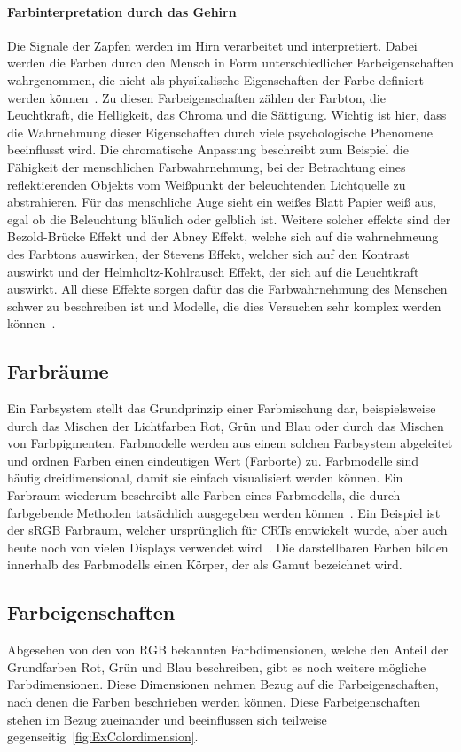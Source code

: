 \documentclass[12pt, a4paper, ngerman]{article}
\begin{document}
\paragraph{Farbinterpretation durch das Gehirn}
Die Signale der Zapfen werden im Hirn verarbeitet und interpretiert. 
Dabei werden die Farben durch den Mensch in Form unterschiedlicher Farbeigenschaften wahrgenommen, 
die nicht als physikalische Eigenschaften der Farbe definiert werden können~\cite{Ottosson_2020}.
Zu diesen Farbeigenschaften zählen der Farbton, die Leuchtkraft, die Helligkeit, das Chroma und die Sättigung.
Wichtig ist hier, dass die Wahrnehmung dieser Eigenschaften durch viele psychologische Phenomene beeinflusst wird.
Die chromatische Anpassung beschreibt zum Beispiel die Fähigkeit der menschlichen Farbwahrnehmung, 
bei der Betrachtung eines reflektierenden Objekts vom Weißpunkt der beleuchtenden Lichtquelle zu abstrahieren. 
Für das menschliche Auge sieht ein weißes Blatt Papier weiß aus, egal ob die Beleuchtung bläulich oder gelblich ist.
Weitere solcher effekte sind der Bezold-Brücke Effekt und der Abney Effekt, welche sich auf die wahrnehmeung des Farbtons auswirken,
der Stevens Effekt, welcher sich auf den Kontrast auswirkt und der Helmholtz-Kohlrausch Effekt, der sich auf die Leuchtkraft auswirkt.
All diese Effekte sorgen dafür das die Farbwahrnehmung des Menschen schwer zu beschreiben ist und Modelle, die dies Versuchen sehr komplex werden können~\cite{Color_appearance_model_2023}.

\subsection{Farbräume}
Ein Farbsystem stellt das Grundprinzip einer Farbmischung dar, 
beispielsweise durch das Mischen der Lichtfarben Rot, Grün und Blau oder durch das Mischen von Farbpigmenten.
Farbmodelle werden aus einem solchen Farbsystem abgeleitet und ordnen Farben einen eindeutigen Wert (Farborte) zu.
Farbmodelle sind häufig dreidimensional, damit sie einfach visualisiert werden können.
Ein Farbraum wiederum beschreibt alle Farben eines Farbmodells, die durch farbgebende Methoden tatsächlich ausgegeben werden können~\cite{Farbraum_2023}.
Ein Beispiel ist der sRGB Farbraum, welcher ursprünglich für CRTs entwickelt wurde, aber auch heute noch von vielen Displays verwendet wird~\cite{sRGB-Farbraum_2019}.
Die darstellbaren Farben bilden innerhalb des Farbmodells einen Körper, der als Gamut bezeichnet wird.

\subsection{Farbeigenschaften} 
Abgesehen von den von RGB bekannten Farbdimensionen, welche den Anteil der Grundfarben Rot, Grün und Blau beschreiben, 
gibt es noch weitere mögliche Farbdimensionen. Diese Dimensionen nehmen Bezug auf die Farbeigenschaften, nach denen die Farben beschrieben werden können.
Diese Farbeigenschaften stehen im Bezug zueinander und beeinflussen sich teilweise gegenseitig~\ref{fig:ExColordimension}.
\end{document}
